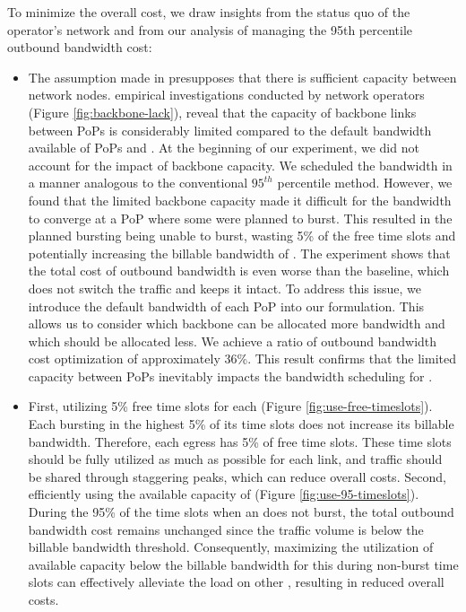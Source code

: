 {To minimize the overall cost, we draw insights from the status quo of the operator's network and from our analysis of managing the 95th percentile outbound bandwidth cost:}
\begin{itemize}
\item{ The assumption made in \cite{singh2021costCascara} presupposes that there is sufficient capacity between network nodes. empirical investigations conducted by network operators (Figure \ref{fig:backbone-lack}), reveal that the capacity of backbone links between PoPs is considerably limited compared to the default bandwidth available of PoPs and {\egresses}. At the beginning of our experiment, we did not account for the impact of backbone capacity. We scheduled the bandwidth in a manner analogous to the conventional $95^{th}$ percentile method. However, we found that the limited backbone capacity made it difficult for the bandwidth to converge at a PoP where some {\egresses} were planned to burst. This resulted in the planned bursting {\egresses} being unable to burst, wasting 5\% of the free time slots and potentially increasing the billable bandwidth of {\egresses}. The experiment shows that the total cost of outbound bandwidth is even worse than the baseline, which does not switch the traffic and keeps it intact. To address this issue, we introduce the default bandwidth of each PoP into our formulation. This allows us to consider which backbone can be allocated more bandwidth and which should be allocated less. We achieve a ratio of outbound bandwidth cost optimization of approximately 36\%. This result confirms that the limited capacity between PoPs inevitably impacts the bandwidth scheduling for {\egresses}}.


\item
{ First, utilizing 5\% free time slots for each {\egress} (Figure \ref{fig:use-free-timeslots}). Each {\egress} bursting in the highest 5\% of its time slots does not increase its billable bandwidth. Therefore, each egress has 5\% of free time slots. These time slots should be fully utilized as much as possible for each link, and traffic should be shared through staggering peaks, which can reduce overall costs. 
Second, efficiently using the available capacity of {\egress} (Figure \ref{fig:use-95-timeslots}). During the 95\% of the time slots when an {\egress} does not burst, the total outbound bandwidth cost remains unchanged since the traffic volume is below the billable bandwidth threshold. Consequently, maximizing the utilization of available capacity below the billable bandwidth for this {\egress} during non-burst time slots can effectively alleviate the load on other {\egresses}, resulting in reduced overall costs.}
\end{itemize}

